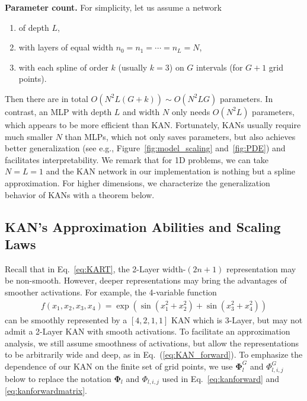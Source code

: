 \documentclass{article}
\numberwithin{equation}{section}
\numberwithin{figure}{section}
\newcommand{\mat}[1]{\mathbf{#1}}
\begin{document}
{\bf Parameter count.} For simplicity, let us assume a network 
\begin{enumerate}[(1)]
    \item of depth $L$,
    \item with layers of equal width $n_0=n_1=\cdots=n_{L}=N$,
    \item with each spline of order $k$ (usually $k=3$) on $G$ intervals (for $G+1$ grid points).
\end{enumerate}
Then there are in total $O(N^2L(G+k))\sim O(N^2LG)$ parameters. In contrast, an MLP with depth $L$ and width $N$ only needs $O(N^2L)$ parameters, which appears to be more efficient than KAN. Fortunately, KANs usually require much smaller $N$ than MLPs, which not only saves parameters, but also achieves better generalization (see e.g., Figure~\ref{fig:model_scaling} and~\ref{fig:PDE}) and facilitates interpretability. 
We remark that for 1D problems, we can take $N=L=1$ and the KAN network in our implementation is nothing but a spline approximation. For higher dimensions, we characterize the generalization behavior of KANs with a theorem below.

\subsection{KAN's Approximation Abilities and Scaling Laws}\label{subsec:kan_scaling_theory}





Recall that in Eq.~\eqref{eq:KART}, the 2-Layer width-$(2n+1)$ representation may be non-smooth. However, deeper representations may bring the advantages of smoother activations. For example, the 4-variable function
\begin{align}
    f(x_1,x_2,x_3,x_4)=\exp\left({\sin}(x_1^2+x_2^2)+{\sin}(x_3^2+x_4^2)\right)
\end{align}
can be smoothly represented by a $[4,2,1,1]$ KAN which is 3-Layer, but may not admit a 2-Layer KAN with smooth activations. To facilitate an approximation analysis, we still assume smoothness of activations, but allow the representations to be arbitrarily wide and deep, as in Eq.~(\ref{eq:KAN_forward}).
To emphasize the dependence of our KAN on the finite set of grid points, we use $\mat{\Phi}_l^G$ and $\Phi_{l,i,j}^G$ below to replace the notation $\mat{\Phi}_l$ and $\Phi_{l,i,j}$ used in Eq.~\eqref{eq:kanforward} and  \eqref{eq:kanforwardmatrix}.
\end{document}
